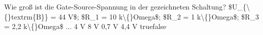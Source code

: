     {Wie groß ist die Gate-Source-Spannung in der gezeichneten Schaltung? \$U\_\{\textbackslash\{\}textrm\{B\}\} = 44 V\$; \$R\_1 = 10 k\textbackslash\{\}Omega\$; \$R\_2 = 1 k\textbackslash\{\}Omega\$; \$R\_3 = 2,2 k\textbackslash\{\}Omega\$ ...}
    {4 V}
    {8 V}
    {0,7 V }
    {4,4 V}
    {true}{false}